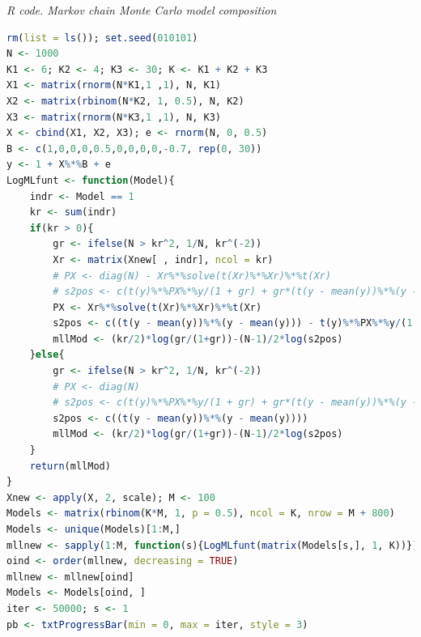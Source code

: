 \begin{enumerate}[leftmargin=*]
	\begin{tcolorbox}[enhanced,width=4.67in,center upper,
		fontupper=\large\bfseries,drop shadow southwest,sharp corners]
		\textit{R code. Markov chain Monte Carlo model composition}
		\begin{VF}
			\begin{lstlisting}[language=R]
rm(list = ls()); set.seed(010101)
N <- 1000
K1 <- 6; K2 <- 4; K3 <- 30; K <- K1 + K2 + K3
X1 <- matrix(rnorm(N*K1,1 ,1), N, K1)
X2 <- matrix(rbinom(N*K2, 1, 0.5), N, K2)
X3 <- matrix(rnorm(N*K3,1 ,1), N, K3)
X <- cbind(X1, X2, X3); e <- rnorm(N, 0, 0.5)
B <- c(1,0,0,0,0.5,0,0,0,0,-0.7, rep(0, 30))
y <- 1 + X%*%B + e
LogMLfunt <- function(Model){
	indr <- Model == 1
	kr <- sum(indr)
	if(kr > 0){
		gr <- ifelse(N > kr^2, 1/N, kr^(-2))
		Xr <- matrix(Xnew[ , indr], ncol = kr)
		# PX <- diag(N) - Xr%*%solve(t(Xr)%*%Xr)%*%t(Xr)
		# s2pos <- c(t(y)%*%PX%*%y/(1 + gr) + gr*(t(y - mean(y))%*%(y - mean(y)))/(1 + gr))
		PX <- Xr%*%solve(t(Xr)%*%Xr)%*%t(Xr)
		s2pos <- c((t(y - mean(y))%*%(y - mean(y))) - t(y)%*%PX%*%y/(1 + gr))
		mllMod <- (kr/2)*log(gr/(1+gr))-(N-1)/2*log(s2pos)
	}else{
		gr <- ifelse(N > kr^2, 1/N, kr^(-2))
		# PX <- diag(N)
		# s2pos <- c(t(y)%*%PX%*%y/(1 + gr) + gr*(t(y - mean(y))%*%(y - mean(y)))/(1 + gr))
		s2pos <- c((t(y - mean(y))%*%(y - mean(y))))
		mllMod <- (kr/2)*log(gr/(1+gr))-(N-1)/2*log(s2pos)
	}
	return(mllMod)
}
Xnew <- apply(X, 2, scale); M <- 100
Models <- matrix(rbinom(K*M, 1, p = 0.5), ncol = K, nrow = M + 800)
Models <- unique(Models)[1:M,]
mllnew <- sapply(1:M, function(s){LogMLfunt(matrix(Models[s,], 1, K))})
oind <- order(mllnew, decreasing = TRUE)
mllnew <- mllnew[oind]
Models <- Models[oind, ]
iter <- 50000; s <- 1
pb <- txtProgressBar(min = 0, max = iter, style = 3)
\end{lstlisting}
		\end{VF}
	\end{tcolorbox} 


\end{enumerate}
